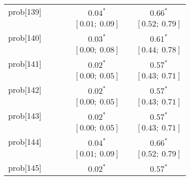 \begin{table}
\begin{center}
\begin{tabular}{l c c c c c c }
prob[139] &                           &                           &                           & $0.04^{*}$              &                           & $0.66^{*}$            \\
          &                           &                           &                           & $[0.01;\ 0.09]$         &                           & $[0.52;\ 0.79]$       \\
prob[140] &                           &                           &                           & $0.03^{*}$              &                           & $0.61^{*}$            \\
          &                           &                           &                           & $[0.00;\ 0.08]$         &                           & $[0.44;\ 0.78]$       \\
prob[141] &                           &                           &                           & $0.02^{*}$              &                           & $0.57^{*}$            \\
          &                           &                           &                           & $[0.00;\ 0.05]$         &                           & $[0.43;\ 0.71]$       \\
prob[142] &                           &                           &                           & $0.02^{*}$              &                           & $0.57^{*}$            \\
          &                           &                           &                           & $[0.00;\ 0.05]$         &                           & $[0.43;\ 0.71]$       \\
prob[143] &                           &                           &                           & $0.02^{*}$              &                           & $0.57^{*}$            \\
          &                           &                           &                           & $[0.00;\ 0.05]$         &                           & $[0.43;\ 0.71]$       \\
prob[144] &                           &                           &                           & $0.04^{*}$              &                           & $0.66^{*}$            \\
          &                           &                           &                           & $[0.01;\ 0.09]$         &                           & $[0.52;\ 0.79]$       \\
prob[145] &                           &                           &                           & $0.02^{*}$              &                           & $0.57^{*}$            \\

\end{tabular}
\end{center}
\end{table}
